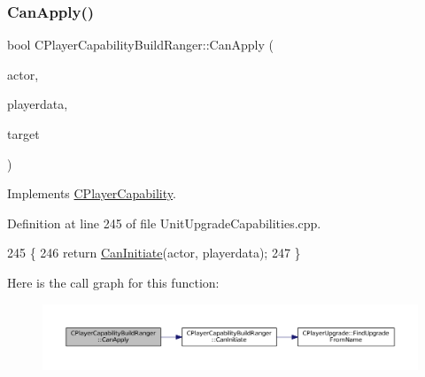 \subsubsection{\texorpdfstring{Can\+Apply()}{CanApply()}}
{\footnotesize\ttfamily bool C\+Player\+Capability\+Build\+Ranger\+::\+Can\+Apply (\begin{DoxyParamCaption}\item[{std\+::shared\+\_\+ptr$<$ \hyperlink{classCPlayerAsset}{C\+Player\+Asset} $>$}]{actor,  }\item[{std\+::shared\+\_\+ptr$<$ \hyperlink{classCPlayerData}{C\+Player\+Data} $>$}]{playerdata,  }\item[{std\+::shared\+\_\+ptr$<$ \hyperlink{classCPlayerAsset}{C\+Player\+Asset} $>$}]{target }\end{DoxyParamCaption})\hspace{0.3cm}{\ttfamily [virtual]}}



Implements \hyperlink{classCPlayerCapability_ae96263e0950f496492f8baeb877b9554}{C\+Player\+Capability}.



Definition at line 245 of file Unit\+Upgrade\+Capabilities.\+cpp.


\begin{DoxyCode}
245                                                                                                            
                                                        \{
246     \textcolor{keywordflow}{return} \hyperlink{classCPlayerCapabilityBuildRanger_ad8b45a3ffc7ee82d5550cc690823d82c}{CanInitiate}(actor, playerdata);
247 \}
\end{DoxyCode}
Here is the call graph for this function\+:
\nopagebreak
\begin{figure}[H]
\begin{center}
\leavevmode
\includegraphics[width=350pt]{classCPlayerCapabilityBuildRanger_a2e688d8f68ab53402afe9303dd28754a_cgraph}
\end{center}
\end{figure}
\hypertarget{classCPlayerCapabilityBuildRanger_ad8b45a3ffc7ee82d5550cc690823d82c}{}\label{classCPlayerCapabilityBuildRanger_ad8b45a3ffc7ee82d5550cc690823d82c} 
